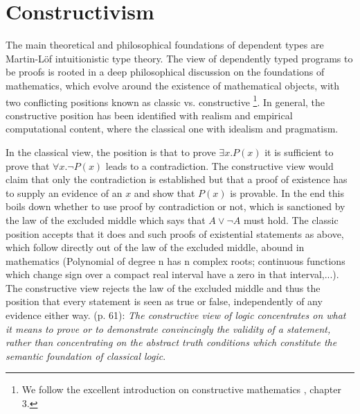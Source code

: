 
\section{Constructivism}
The main theoretical and philosophical foundations of dependent types are Martin-L\"of intuitionistic type theory. The view of dependently typed programs to be proofs is rooted in a deep philosophical discussion on the foundations of mathematics, which evolve around the existence of mathematical objects, with two conflicting positions known as classic vs. constructive \footnote{We follow the excellent introduction on constructive mathematics \cite{thompson_type_1991}, chapter 3.}. In general, the constructive position has been identified with realism and empirical computational content, where the classical one with idealism and pragmatism.

In the classical view, the position is that to prove $\exists x. P(x)$ it is sufficient to prove that $\forall x. \neg P(x)$ leads to a contradiction. The constructive view would claim that only the contradiction is established but that a proof of existence has to supply an evidence of an $x$ and show that $P(x)$ is provable. In the end this boils down whether to use proof by contradiction or not, which is sanctioned by the law of the excluded middle which says that $A \lor \neg A$ must hold. The classic position accepts that it does and such proofs of existential statements as above, which follow directly out of the law of the excluded middle, abound in mathematics (Polynomial of degree n has n complex roots; continuous functions which change sign over a compact real interval have a zero in that interval,...). The constructive view rejects the law of the excluded middle and thus the position that every statement is seen as true or false, independently of any evidence either way. \cite{thompson_type_1991} (p. 61): \textit{The constructive view of logic concentrates on what it means to prove or to demonstrate convincingly the validity of a statement, rather than concentrating on the abstract truth conditions which constitute the semantic foundation of classical logic}.

